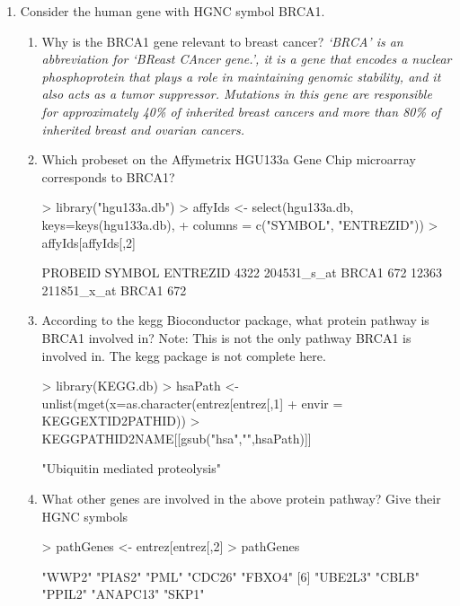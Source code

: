 \documentclass[12pt,a4paper]{paper}
\begin{document}
\begin{enumerate}
\item Consider the human gene with HGNC symbol BRCA1.
\begin{enumerate}
\item Why is the BRCA1 gene relevant to breast cancer? \textit{`BRCA' is an abbreviation for `BReast CAncer gene.', it is a gene that encodes a nuclear phosphoprotein that plays a role in maintaining genomic stability, and it also acts as a tumor suppressor. Mutations in this gene are responsible for approximately 40\% of inherited breast cancers and more than 80\% of inherited breast and ovarian cancers.}
\item Which probeset on the Affymetrix HGU133a Gene Chip microarray corresponds to BRCA1?
\begin{Schunk}
\begin{Sinput}
> library("hgu133a.db")
> affyIds <- select(hgu133a.db, keys=keys(hgu133a.db), 
+                   columns = c("SYMBOL", "ENTREZID"))
> affyIds[affyIds[,2] %in% "BRCA1",]
\end{Sinput}
\begin{Soutput}
          PROBEID SYMBOL ENTREZID
4322  204531_s_at  BRCA1      672
12363 211851_x_at  BRCA1      672
\end{Soutput}
\end{Schunk}
\item According to the kegg Bioconductor package, what protein pathway is BRCA1 involved
in? Note: This is not the only pathway BRCA1 is involved in. The kegg package is not
complete here.
\begin{Schunk}
\begin{Sinput}
> library(KEGG.db)
> hsaPath <- unlist(mget(x=as.character(entrez[entrez[,1] %in% "BRCA1",2]), 
+             envir = KEGGEXTID2PATHID))
> KEGGPATHID2NAME[[gsub("hsa","",hsaPath)]]
\end{Sinput}
\begin{Soutput}
[1] "Ubiquitin mediated proteolysis"
\end{Soutput}
\end{Schunk}
\item What other genes are involved in the above protein pathway? Give their HGNC symbols
\begin{Schunk}
\begin{Sinput}
> pathGenes <- entrez[entrez[,2] %in% KEGGPATHID2EXTID[[hsaPath]],1]
> pathGenes
\end{Sinput}
\begin{Soutput}
  [1] "WWP2"    "PIAS2"   "PML"     "CDC26"   "FBXO4"  
  [6] "UBE2L3"  "CBLB"    "PPIL2"   "ANAPC13" "SKP1"   

\end{Soutput}
\end{Schunk}
\end{enumerate}
\end{enumerate}
\end{document}

